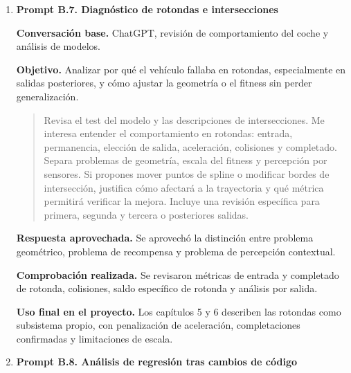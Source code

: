 {\begin{enumerate}[leftmargin=*,itemsep=0.2\baselineskip,topsep=2pt,parsep=0pt,partopsep=0pt]
  \textbf{Respuesta aprovechada.} Se aprovechó la idea de no tratar cada copia fechada como un modelo independiente si sus pesos no aportaban una política distinta.

  \textbf{Comprobación realizada.} Se compararon pesos, informes de test, métricas por sesión y diferencias entre \texttt{SuperCarModel} y \texttt{SessionCarModel}.

  \textbf{Uso final en el proyecto.} El capítulo 5 explica la persistencia de modelos y el capítulo 6 evita sustituir la referencia por sesiones posteriores no reproducibles.

  \item \textbf{Prompt B.7. Diagnóstico de rotondas e intersecciones}

  \textbf{Conversación base.} ChatGPT, revisión de comportamiento del coche y análisis de modelos.

  \textbf{Objetivo.} Analizar por qué el vehículo fallaba en rotondas, especialmente en salidas posteriores, y cómo ajustar la geometría o el fitness sin perder generalización.

  \promptDepurado
  \begin{quote}
  \small
  Revisa el test del modelo y las descripciones de intersecciones. Me interesa entender el comportamiento en rotondas: entrada, permanencia, elección de salida, aceleración, colisiones y completado. Separa problemas de geometría, escala del fitness y percepción por sensores. Si propones mover puntos de spline o modificar bordes de intersección, justifica cómo afectará a la trayectoria y qué métrica permitirá verificar la mejora. Incluye una revisión específica para primera, segunda y tercera o posteriores salidas.
  \end{quote}

  \textbf{Respuesta aprovechada.} Se aprovechó la distinción entre problema geométrico, problema de recompensa y problema de percepción contextual.

  \textbf{Comprobación realizada.} Se revisaron métricas de entrada y completado de rotonda, colisiones, saldo específico de rotonda y análisis por salida.

  \textbf{Uso final en el proyecto.} Los capítulos 5 y 6 describen las rotondas como subsistema propio, con penalización de aceleración, completaciones confirmadas y limitaciones de escala.

  \item \textbf{Prompt B.8. Análisis de regresión tras cambios de código}


\end{enumerate}}
